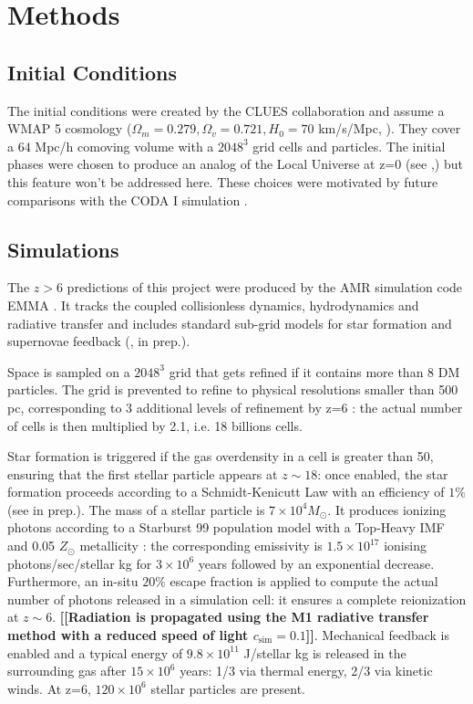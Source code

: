 \documentclass[twocolumn]{aastex61}
\newcommand{\dom}[1]{{\bf [[#1]]}}
\begin{document}
\section{Methods}

\subsection{Initial Conditions}
The initial conditions were created by the CLUES collaboration and assume a WMAP 5 cosmology ($\Omega_m=0.279, \Omega_v=0.721, H_0=70$ km/s/Mpc, \citet{HIN9}). They cover a $64$ Mpc/h comoving volume with a $2048^3$ grid cells and particles.  The initial phases were chosen to produce an analog of the Local Universe at z=0 (see \citet{GOT10},\citet{ILI11}) but this feature won't be addressed here. These choices were motivated by future comparisons with the CODA I simulation \citep{OCV16}.

\subsection{Simulations}
The $z>6$ predictions of this project were produced by the AMR simulation code EMMA \citep{AUB15}. It tracks the coupled collisionless dynamics, hydrodynamics and radiative transfer and includes standard sub-grid models for star formation and supernovae feedback (\citet{DEP17}, in prep.). 

Space is sampled on a $2048^3$  grid that gets refined if it contains more than 8 DM particles. The grid is prevented to refine to physical resolutions smaller than 500 pc, corresponding to 3 additional levels of refinement by z=6 : the actual number of cells is then multiplied by 2.1, i.e. 18 billions cells. 

Star formation is triggered if the gas overdensity in a cell is greater than 50, ensuring that the first stellar particle appears at $z\sim 18$: once enabled, the star formation proceeds according to a Schmidt-Kenicutt Law with an efficiency of $1\%$ (see \citet{DEP17} in prep.). The mass of a stellar particle is  $7\times 10^4 M_\odot$. It produces ionizing photons according to a Starburst 99 population model \citep{LEI99} with a Top-Heavy IMF and 0.05 $Z_\odot$ metallicity : the corresponding emissivity is $1.5\times 10^{17}$ ionising photons/sec/stellar kg for $3\times 10^6$ years followed by an exponential decrease. Furthermore, an in-situ $20\%$ escape fraction is applied to compute the actual number of photons released in a simulation cell: it ensures a complete reionization at $z\sim 6$.  \dom{Radiation is propagated using the M1 radiative transfer method with a reduced speed of light $c_\mathrm{sim}=0.1$}. Mechanical feedback is enabled and a typical energy of $9.8\times 10^{11}$ J/stellar kg is released in the surrounding gas after $15\times 10^6$ years: 1/3 via thermal energy, 2/3 via kinetic winds. At z=6, $120\times 10^6$ stellar particles are present.
\end{document}
